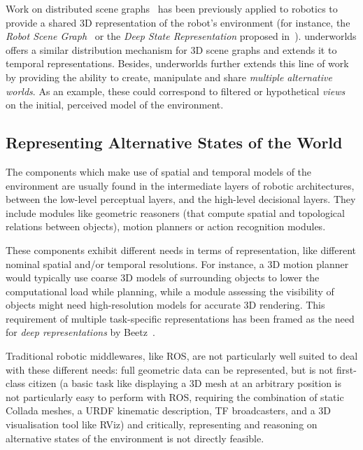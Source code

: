 \documentclass[letterpaper, 10pt, conference]{ieeeconf}
\newcommand{\eg}{e.g.,\xspace}
\newcommand{\uwds}{{\sc underworlds}\xspace}
\begin{document}
Work on distributed scene graphs~\cite{naef2003blue} has been previously applied
to robotics to provide a shared 3D representation of the robot's environment
(for instance, the \emph{Robot Scene Graph}~\cite{blumenthal2013scene} or the
\emph{Deep State Representation} proposed in~\cite{bustos2016unified}).  \uwds
offers a similar distribution mechanism for 3D scene graphs and extends it to
temporal representations. Besides, \uwds further extends this line of work by
providing the ability to create, manipulate and share \emph{multiple alternative
worlds}. As an example, these could correspond to filtered or hypothetical
\emph{views} on the initial, perceived model of the environment.

\subsection{Representing Alternative States of the World}

The components which make use of spatial and temporal models of the environment
are usually found in the intermediate layers of robotic architectures, between
the low-level perceptual layers, and the high-level decisional layers. They
include modules like geometric reasoners (that compute spatial and topological
relations between objects), motion planners or action recognition modules.

These components exhibit different needs in terms of representation,
like different nominal spatial and/or temporal resolutions. For instance, a 3D
motion planner would typically use coarse 3D models of surrounding objects to
lower the computational load while planning, while a module assessing the
visibility of objects might need high-resolution models 
for accurate 3D rendering. This requirement of multiple
task-specific representations has been framed as the need for \emph{deep
representations} by Beetz~\cite{beetz2010towards}.


Traditional robotic middlewares, like ROS, are not particularly well suited to
deal with these different needs: full geometric data can be represented, but is
not first-class citizen (a basic task like displaying a 3D mesh at an arbitrary
position is not particularly easy to perform with ROS, requiring the combination
of static Collada meshes, a URDF kinematic description, TF broadcasters, and a
3D visualisation tool like RViz) and critically,
representing and reasoning on alternative states of the environment is not
directly feasible.
\end{document}
